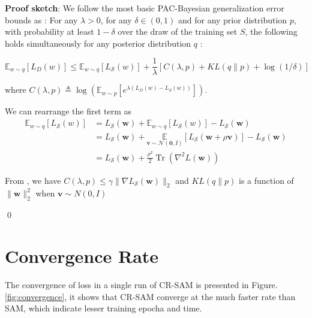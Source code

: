 \documentclass[letterpaper]{article} %
\theoremstyle{plain}
\theoremstyle{definition}
\begin{document}
\textbf{Proof sketch}:
We follow the most basic PAC-Bayesian generalization error bounds as \cite{JMLR:v17:15-290, gat2022importance}: For any $\lambda>0$, for any $\delta \in(0,1)$ and for any prior distribution $p$, with probability at least $1-\delta$ over the draw of the training set $S$, the following holds simultaneously for any posterior distribution $q$ :

\begin{equation}
\mathbb{E}_{w \sim q}\left[L_D(w)\right] \leq \mathbb{E}_{w \sim q}\left[L_\mathcal{S}(w)\right]+\frac{1}{\lambda}[C(\lambda, p)+K L(q \| p)+\log (1 / \delta)]
\end{equation}

where $C(\lambda, p) \triangleq \log \left(\mathbb{E}_{w \sim p}\left[e^{\lambda\left(L_D(w)-L_S(w)\right)}\right]\right)$.

We can rearrange the first term as
\begin{align*}
\mathbb{E}_{w \sim q}\left[L_\mathcal{S}(w)\right] &= L_{\mathcal{S}}(\boldsymbol{w})
 + \mathbb{E}_{w \sim q}\left[L_\mathcal{S}(w)\right] - L_{\mathcal{S}}(\boldsymbol{w}) \\
 &= L_{\mathcal{S}}(\boldsymbol{w}) + \underset{\boldsymbol{\boldsymbol{v}} \sim \mathcal{N}(\mathbf{0}, I)}{\mathbb{E}}\left[L_{\mathcal{S}}(\boldsymbol{w}+\rho\boldsymbol{v})\right]-L_{\mathcal{S}}(\boldsymbol{w}) \\
 &= L_{\mathcal{S}}(\boldsymbol{w}) + \frac{\rho^2}{2} \operatorname{Tr}\left(\nabla^2 L\left(\boldsymbol{w}\right)\right)
\end{align*}

From \cite{gat2022importance}, we have $C(\lambda, p) \leq \gamma\|\nabla L_{\mathcal{S}}(\boldsymbol{w})\|_2$ and $K L(q \| p)$ is a function of $\|\boldsymbol{w}\|_2^2$  when $\boldsymbol{v} \sim N(0, I)$

\qed


\section{Convergence Rate}

The convergence of loss in a single run of CR-SAM is presented in Figure. \ref{fig:convergence}, it shows that CR-SAM converge at the much faster rate than SAM, which indicate lesser training epocha and time.
\end{document}
